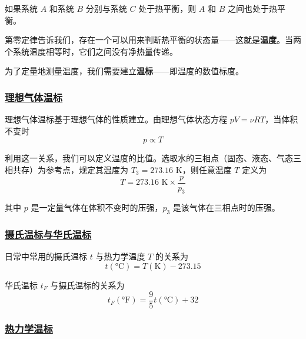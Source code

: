 \begin{theorem}[热力学第零定律]
    如果系统 $A$ 和系统 $B$ 分别与系统 $C$ 处于热平衡，则 $A$ 和 $B$ 之间也处于热平衡。
\end{theorem}

第零定律告诉我们，存在一个可以用来判断热平衡的状态量——这就是\textbf{温度}。当两个系统温度相等时，它们之间没有净热量传递。

为了定量地测量温度，我们需要建立\textbf{温标}——即温度的数值标度。

\subsubsection{\protect\hyperlink{:}{理想气体温标}}

理想气体温标基于理想气体的性质建立。由理想气体状态方程 $pV = \nu RT$，当体积不变时
\begin{equation}
    p \propto T
\end{equation}

利用这一关系，我们可以定义温度的比值。选取水的三相点（固态、液态、气态三相共存）为参考点，规定其温度为 $T_3 = 273.16$ K，则任意温度 $T$ 定义为
\begin{equation}
    T = 273.16 \text{ K} \times \frac{p}{p_3}
\end{equation}

其中 $p$ 是一定量气体在体积不变时的压强，$p_3$ 是该气体在三相点时的压强。

\subsubsection{\protect\hyperlink{:}{摄氏温标与华氏温标}}

日常中常用的摄氏温标 $t$ 与热力学温度 $T$ 的关系为
\begin{equation}
    t(\text{°C}) = T(\text{K}) - 273.15
\end{equation}

华氏温标 $t_F$ 与摄氏温标的关系为
\begin{equation}
    t_F(\text{°F}) = \frac{9}{5}t(\text{°C}) + 32
\end{equation}

\subsubsection{\protect\hyperlink{:}{热力学温标}}

